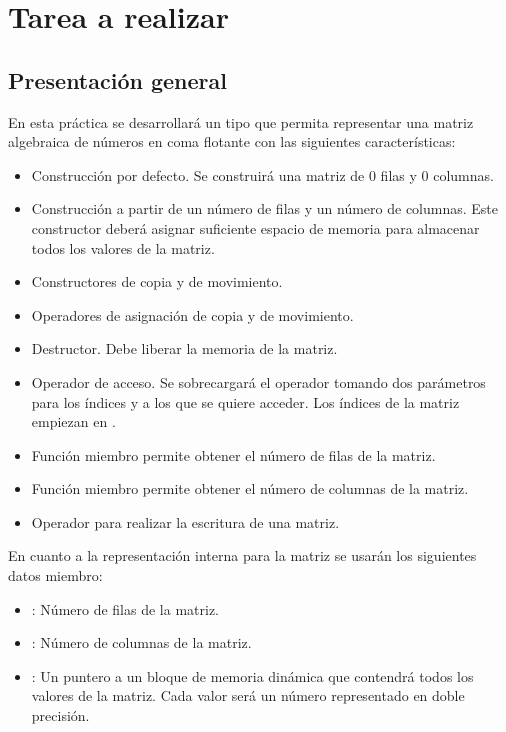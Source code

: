 \section{Tarea a realizar}

\subsection{Presentación general}

En esta práctica se desarrollará un tipo que permita representar una matriz
algebraica de números en coma flotante con las siguientes características:

\begin{itemize}

\item Construcción por defecto. Se construirá una matriz de 0 filas y 0
columnas.

\item Construcción a partir de un número de filas y un número de columnas. Este
constructor deberá asignar suficiente espacio de memoria para almacenar todos
los valores de la matriz.

\item Constructores de copia y de movimiento.

\item Operadores de asignación de copia y de movimiento.

\item Destructor. Debe liberar la memoria de la matriz.

\item Operador de acceso. Se sobrecargará el operador \cppid{()} tomando dos
parámetros para los índices  y  a los que se quiere acceder.
Los índices de la matriz empiezan en .

\item Función miembro  permite obtener el número de filas de la
matriz.

\item Función miembro  permite obtener el número de columnas
de la matriz.

\item Operador \cppid{<{}<} para realizar la escritura de una matriz.

\end{itemize}

En cuanto a la representación interna para la matriz se usarán los siguientes
datos miembro:

\begin{itemize}
\item {}: Número de filas de la matriz.
\item {}: Número de columnas de la matriz.
\item {}: Un puntero a un bloque de memoria dinámica que contendrá
todos los valores de la matriz. Cada valor será un número representado en doble
precisión.
\end{itemize}

